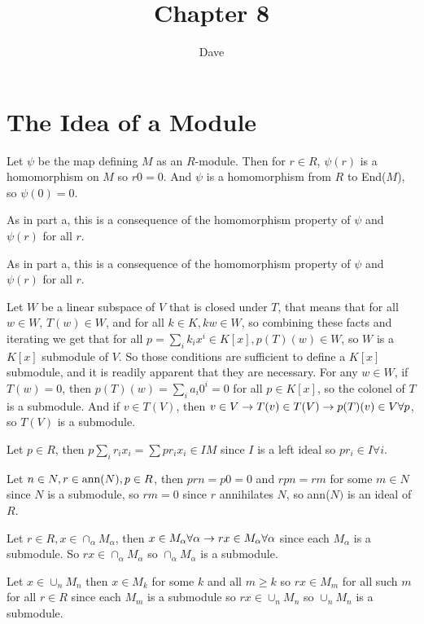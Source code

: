 \documentclass[11pt, oneside]{article}   	%
\title{Chapter 8}
\author{Dave}
\begin{document}
\maketitle
\section{The Idea of a Module}
\be
\item \be
\item Let $\psi$ be the map defining $M$ as an $R$-module. Then for $r \in R$, $\psi(r)$ is a homomorphism on $M$ so $r0 = 0$. And $\psi$ is a homomorphism from $R$ to End($M$), so $\psi(0) = 0$.
\item As in part a, this is a consequence of the homomorphism property of $\psi$ and $\psi(r)$ for all $r$.
\item As in part a, this is a consequence of the homomorphism property of $\psi$ and $\psi(r)$ for all $r$.
\ee
\item Let $W$ be a linear subspace of $V$ that is closed under $T$, that means that for all $w \in W$, $T(w) \in W$, and for all $k \in K, kw \in W$, so combining these facts and iterating we get that for all $p = \sum_ik_ix^i \in K[x], p(T)(w) \in W$, so $W$ is a $K[x]$ submodule of $V$. So those conditions are sufficient to define a $K[x]$ submodule, and it is readily apparent that they are necessary. For any $w \in W$, if $T(w) = 0$, then $p(T)(w) = \sum_ia_i0^i = 0$ for all $p \in K[x]$, so the colonel of $T$ is a submodule. And if $v \in T(V)$, then $v \in V \rightarrow T(v) \in T(V) \rightarrow p(T)(v) \in V \forall p$, so $T(V)$ is a submodule.
\item Let $p \in R$, then $p\sum_ir_ix_i = \sum pr_ix_i \in IM$ since $I$ is a left ideal so $pr_i \in I \forall i$.
\item Let $n \in N, r \in \text{ann}(N), p \in R$, then $prn = p0 = 0$ and $rpn = rm$ for some $m \in N$ since $N$ is a submodule, so $rm = 0$ since $r$ annihilates $N$, so ann($N)$ is an ideal of $R$.
\item \be
\item Let $r \in R, x \in \cap_\alpha M_\alpha$, then $x \in M_\alpha \forall \alpha \rightarrow rx \in M_\alpha \forall \alpha$ since each $M_\alpha$ is a submodule. So $rx \in \cap_\alpha M_\alpha$ so $\cap_\alpha M_\alpha$ is a submodule.
\item Let $x \in \cup_nM_n$ then $x \in M_k$ for some $k$ and all $m \ge k$ so $rx \in M_m$ for all such $m$ for all $r \in R$ since each $M_m$ is a submodule so $rx \in \cup_n M_n$ so $\cup_n M_n$ is a submodule.
\end{document}
